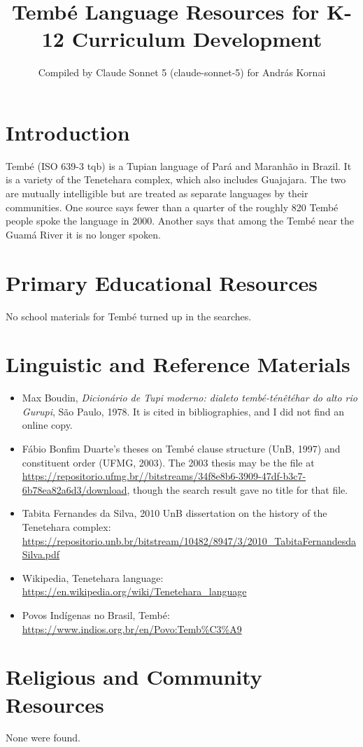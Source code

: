 \documentclass[12pt]{article}
\title{Temb\'e Language Resources for K-12 Curriculum Development}
\author{Compiled by Claude Sonnet 5 (claude-sonnet-5) for Andr\'as Kornai}
\date{}
\begin{document}
\maketitle

\section{Introduction}
Temb\'e (ISO 639-3 tqb) is a Tupian language of Par\'a and Maranh\~ao in Brazil. It is a variety of the Tenetehara complex, which also includes Guajajara. The two are mutually intelligible but are treated as separate languages by their communities. One source says fewer than a quarter of the roughly 820 Temb\'e people spoke the language in 2000. Another says that among the Temb\'e near the Guam\'a River it is no longer spoken.

\section{Primary Educational Resources}
No school materials for Temb\'e turned up in the searches.

\section{Linguistic and Reference Materials}
\begin{itemize}
\item Max Boudin, \emph{Dicion\'ario de Tupi moderno: dialeto temb\'e-t\'en\^et\'ehar do alto rio Gurupi}, S\~ao Paulo, 1978. It is cited in bibliographies, and I did not find an online copy.
\item F\'abio Bonfim Duarte's theses on Temb\'e clause structure (UnB, 1997) and constituent order (UFMG, 2003). The 2003 thesis may be the file at \url{https://repositorio.ufmg.br//bitstreams/34f8e8b6-3909-47df-b3c7-6b78ea82a6d3/download}, though the search result gave no title for that file.
\item Tabita Fernandes da Silva, 2010 UnB dissertation on the history of the Tenetehara complex: \url{https://repositorio.unb.br/bitstream/10482/8947/3/2010_TabitaFernandesdaSilva.pdf}
\item Wikipedia, Tenetehara language: \url{https://en.wikipedia.org/wiki/Tenetehara_language}
\item Povos Ind\'igenas no Brasil, Temb\'e: \url{https://www.indios.org.br/en/Povo:Temb%C3%A9}
\end{itemize}

\section{Religious and Community Resources}
None were found.
\end{document}
